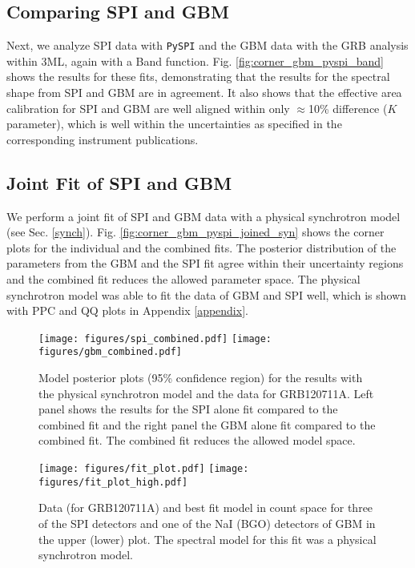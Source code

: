 \documentclass[twocolumn,traditabstract]{aa}
\begin{document}
\subsection{Comparing SPI and GBM}
\label{pyspi_gbm}
Next, we analyze SPI data with {\tt PySPI} and the GBM data with the GRB analysis within 3ML, again with a Band function. Fig. \ref{fig:corner_gbm_pyspi_band} shows the results for these fits, demonstrating that the results for the spectral shape from SPI and GBM are in agreement. It also shows that the effective area calibration for SPI and GBM are well aligned within only $\approx$10\% difference ($K$ parameter), which is well within the
uncertainties as specified in the corresponding instrument publications.

\subsection{Joint Fit of SPI and GBM}
\label{pyspi_gbm_joined}
We perform a joint fit of SPI and GBM data with a physical synchrotron model (see Sec. \ref{synch}). Fig. \ref{fig:corner_gbm_pyspi_joined_syn} shows the corner plots for the individual and the combined fits. The posterior distribution of the parameters from the GBM and the SPI fit agree within their uncertainty regions and the combined fit reduces the allowed parameter space. The physical synchrotron model was able to fit the data of GBM and SPI well, which is shown with PPC and QQ plots in Appendix \ref{appendix}.



\begin{figure*}
  \begin{centering}
    \texttt{[image: figures/spi\_combined.pdf]}
    \texttt{[image: figures/gbm\_combined.pdf]}
    \caption{Model posterior plots (95\% confidence region) for the results with the physical synchrotron model and the data for GRB120711A. Left panel shows the results for the SPI alone fit compared to the combined fit and the right panel the GBM alone fit compared to the combined fit. The combined fit reduces the allowed model space.}
    \label{fig:model_plot_syn}
  \end{centering}
\end{figure*}
\begin{figure*}
  \begin{centering}
    \texttt{[image: figures/fit\_plot.pdf]}
    \texttt{[image: figures/fit\_plot\_high.pdf]}
    \caption{Data (for GRB120711A) and best fit model in count space for three of the SPI detectors and one of the NaI (BGO) detectors of GBM in the upper (lower) plot. The spectral model for this fit was a physical synchrotron model.}
    \label{fig:dataplot}
  \end{centering}
\end{figure*}
\end{document}
